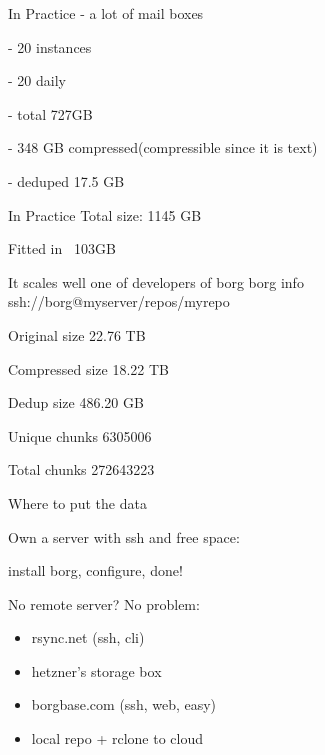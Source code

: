 \documentclass{beamer}
\begin{document}
\begin{frame}{In Practice}
	- a lot of mail boxes
	
	- 20 instances
	
	- 20 daily
	
	- total 727GB
	
	- 348 GB compressed(compressible since it is text)
	
	- deduped 17.5 GB
\end{frame}

\begin{frame}{In Practice}
	Total size: 1145 GB
	
	Fitted in ~103GB
\end{frame}

\begin{frame}{It scales well}
	one of developers of borg
	borg info ssh://borg@myserver/repos/myrepo
	
	Original size  22.76 TB
	
	 Compressed size 18.22 TB
	 
	   Dedup size 486.20 GB
	   
	Unique chunks 6305006
	
	         Total chunks                          272643223
\end{frame}

\begin{frame}{Where to put the data}
	
	Own a server with ssh and free space:
	
	install borg, configure, done!
	
	No remote server? No problem:
	\begin{itemize}
		\item rsync.net (ssh, cli)
		\item hetzner's storage box
		\item borgbase.com (ssh, web, easy)
		\item local repo + rclone to cloud
	\end{itemize}
\end{frame}
\end{document}
